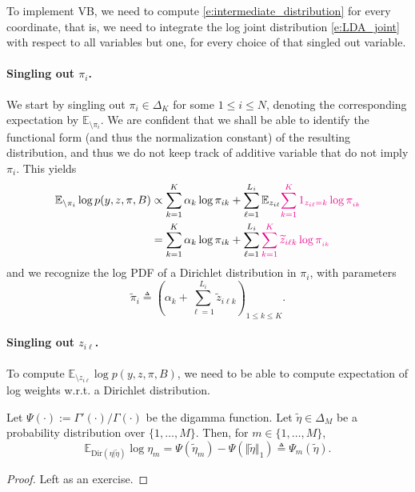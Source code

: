 To implement VB, we need to compute \eqref{e:intermediate_distribution} for every coordinate, that is, we need to integrate the log joint distribution \eqref{e:LDA_joint} with respect to all variables but one, for every choice of that singled out variable.

\paragraph{Singling out $\pi_i$.}
We start by singling out $\pi_i\in \Delta_K$ for some $1\leq i \leq N$, denoting the corresponding expectation by $\mathbb E_{\setminus \pi_i}$.
We are confident that we shall be able to identify the functional form (and thus the normalization constant) of the resulting distribution, and thus we do not keep track of additive variable that do not imply $\pi_i$.
This yields
\begin{align*}
\mathbb{E}_{\setminus \pi_i} \log p(y,z,\pi, B) &\propto \sum_{k=1}^K \alpha_k \log \pi_{ik} + \sum_{\ell=1}^{L_i} \mathbb{E}_{z_{i\ell}}\textcolor{magenta}{\sum_{k=1}^K  1_{z_{i\ell}=k}\log\pi_{_{ik}}}\\
&= \sum_{k=1}^K \alpha_k \log \pi_{ik} + \sum_{\ell=1}^{L_i} \textcolor{magenta}{\sum_{k=1}^K \widetilde{z}_{i\ell k}\log\pi_{_{ik}}}
\end{align*}
and we recognize the log PDF of a Dirichlet distribution in $\pi_i$, with parameters
$$
\widetilde\pi_i \triangleq \left( \alpha_k + \sum_{\ell=1}^{L_i} \widetilde{z}_{i\ell k}  \right)_{1\leq k\leq K}.
$$

\paragraph{Singling out $z_{i\ell}$.}
To compute $\mathbb{E}_{\setminus z_{i\ell}} \log p(y,z,\pi, B)$, we need to be able to compute expectation of log weights w.r.t. a Dirichlet distribution.
\begin{lemma}
Let $\Psi(\cdot) := \Gamma'(\cdot)/\Gamma(\cdot)$ be the digamma function.
Let $\widetilde\eta\in \Delta_M$ be a probability distribution over $\{1,\dots, M\}$.
Then, for $m\in \{1,\dots, M\}$,
$$
  \mathbb{E}_{\text{Dir}(\eta\vert\widetilde\eta)} \log \eta_m = \Psi(\widetilde\eta_m) - \Psi(\Vert \widetilde\eta\Vert_1) \triangleq \Psi_m(\widetilde{\eta}).
$$
\end{lemma}
\begin{proof}
  Left as an exercise.
\end{proof}

